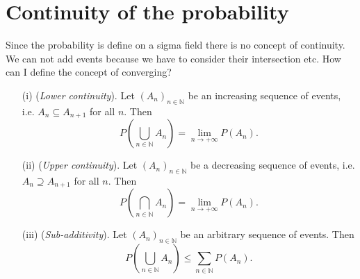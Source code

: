     \section{Continuity of the probability}
    Since the probability is define on a sigma field there is no concept of continuity. We can not add events because we have to consider their intersection etc. How can I define the concept of converging?
    \begin{itemize}
    \item[(i)] (\textit{Lower continuity}). Let $(A_n)_{n \in \mathbb{N}}$ be an increasing sequence of events, i.e. $A_n \subseteq A_{n+1}$ for all $n$. Then
    \[
    {P}\left( \bigcup_{n \in \mathbb{N}} A_n \right) = \lim_{n \to +\infty} {P}(A_n). \tag{1.5}
    \]
    \item[(ii)] (\textit{Upper continuity}). Let $(A_n)_{n \in \mathbb{N}}$ be a decreasing sequence of events, i.e. $A_n \supseteq A_{n+1}$ for all $n$. Then
    \[
    {P}\left( \bigcap_{n \in \mathbb{N}} A_n \right) = \lim_{n \to +\infty} {P}(A_n). \tag{1.6}
    \]
    \item[(iii)] (\textit{Sub-additivity}). Let $(A_n)_{n \in \mathbb{N}}$ be an arbitrary sequence of events. Then
    \[
    {P}\left( \bigcup_{n \in \mathbb{N}} A_n \right) \leq \sum_{n \in \mathbb{N}} {P}(A_n).
    \]
    \end{itemize}